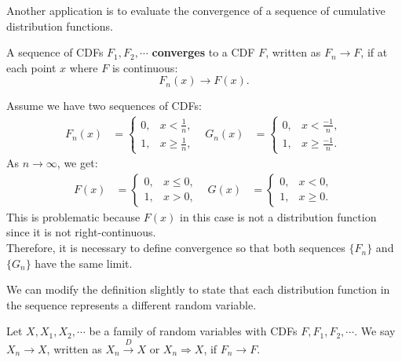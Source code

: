 \documentclass{huhtakm-template-book-v2}
\begin{document}
    Another application is to evaluate the convergence of a sequence of cumulative distribution functions.
    \begin{defn}
        A sequence of CDFs $F_{1},F_{2},\cdots$ \textbf{converges} to a CDF $F$, written as $F_{n} \to F$, if at each point $x$ where $F$ is continuous:
        \begin{equation*}
            F_{n}(x) \to F(x).
        \end{equation*}
    \end{defn}
    \begin{eg}
        Assume we have two sequences of CDFs:
        \begin{align*}
            F_{n}(x) &= \begin{cases}
                0, &x < \frac{1}{n},\\
                1, &x \geq \frac{1}{n},
            \end{cases} & G_{n}(x) &= \begin{cases}
                0, &x < \frac{-1}{n},\\
                1, &x \geq \frac{-1}{n}.
            \end{cases}
        \end{align*}
        As $n \to \infty$, we get:
        \begin{align*}
            F(x) &= \begin{cases}
                0, &x \leq 0,\\
                1, &x > 0,
            \end{cases} & G(x) &= \begin{cases}
                0, &x < 0,\\
                1, &x \geq 0.
            \end{cases}
        \end{align*}
        This is problematic because $F(x)$ in this case is not a distribution function since it is not right-continuous.\\
        Therefore, it is necessary to define convergence so that both sequences $\{F_{n}\}$ and $\{G_{n}\}$ have the same limit.
    \end{eg}
    We can modify the definition slightly to state that each distribution function in the sequence represents a different random variable.
    \begin{defn}
        Let $X,X_{1},X_{2},\cdots$ be a family of random variables with CDFs $F,F_{1},F_{2},\cdots$. We say $X_{n} \to X$, written as $X_{n} \xrightarrow{D} X$ or $X_{n}\Rightarrow X$, if $F_{n} \to F$.
    \end{defn}
\end{document}
